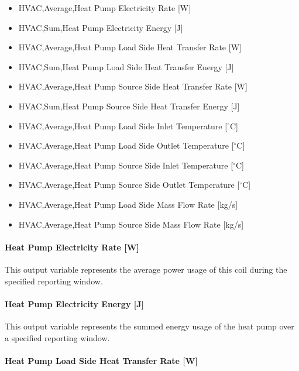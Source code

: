 \begin{itemize}
    \item
    HVAC,Average,Heat Pump Electricity Rate {[}W{]}
    \item
    HVAC,Sum,Heat Pump Electricity Energy {[}J{]}
    \item
    HVAC,Average,Heat Pump Load Side Heat Transfer Rate {[}W{]}
    \item
    HVAC,Sum,Heat Pump Load Side Heat Transfer Energy {[}J{]}
    \item
    HVAC,Average,Heat Pump Source Side Heat Transfer Rate {[}W{]}
    \item
    HVAC,Sum,Heat Pump Source Side Heat Transfer Energy {[}J{]}
    \item
    HVAC,Average,Heat Pump Load Side Inlet Temperature {[}$^\circ$C{]}
    \item
    HVAC,Average,Heat Pump Load Side Outlet Temperature {[}$^\circ$C{]}
    \item
    HVAC,Average,Heat Pump Source Side Inlet Temperature {[}$^\circ$C{]}
    \item
    HVAC,Average,Heat Pump Source Side Outlet Temperature {[}$^\circ$C{]}
    \item
    HVAC,Average,Heat Pump Load Side Mass Flow Rate {[}kg/s{]}
    \item
    HVAC,Average,Heat Pump Source Side Mass Flow Rate {[}kg/s{]}
\end{itemize}

\paragraph{Heat Pump Electricity Rate {[}W{]}}\label{plhp_eir_outputs_power_usage}

This output variable represents the average power usage of this coil during the specified reporting window.

\paragraph{Heat Pump Electricity Energy {[}J{]}}\label{plhp_eir_outputs_energy_usage}

This output variable represents the summed energy usage of the heat pump over a specified reporting window.

\paragraph{Heat Pump Load Side Heat Transfer Rate {[}W{]}}\label{plhp_eir_outputs_q_load}

